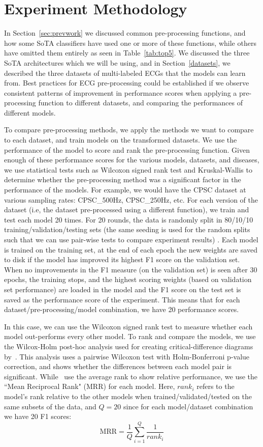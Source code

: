 \documentclass[pmlr,twocolumn]{jmlr}%
\begin{document}
\section{Experiment Methodology}
\label{sec:experiment}

In Section~\ref{sec:prevwork} we discussed common pre-processing functions, and how some SoTA classifiers have used one or more of these functions, while others have omitted them entirely as seen in Table~\ref{tab:top5}. We discussed the three SoTA architectures which we will be using, and in Section~\ref{datasets}, we described the three datasets of multi-labeled ECGs that the models can learn from. Best practices for ECG pre-processing could be established if we observe consistent patterns of improvement in performance scores when applying a pre-processing function to different datasets, and comparing the performances of different models.

To compare pre-processing methods, we apply the methods we want to compare to each dataset, and train models on the transformed datasets. We use the performance of the model to score and rank the pre-processing function. Given enough of these performance scores for the various models, datasets, and diseases, we use statistical tests such as Wilcoxon signed rank test and Kruskal-Wallis to determine whether the pre-processing method was a significant factor in the performance of the models. For example, we would have the CPSC dataset at various sampling rates: CPSC\_500Hz, CPSC\_250Hz, etc. For each version of the dataset (i.e, the dataset pre-processed using a different function), we train and test each model 20 times. For 20 rounds, the data is randomly split in 80/10/10 training/validation/testing sets (the same seeding is used for the random splits such that we can use pair-wise tests to compare experiment results) . Each model is trained on the training set, at the end of each epoch the new weights are saved to disk if the model has improved its highest F1 score on the validation set. When no improvements in the F1 measure (on the validation set) is seen after 30 epochs, the training stops, and the highest scoring weights (based on validation set performance) are loaded in the model and the F1 score on the test set is saved as the performance score of the experiment. This means that for each dataset/pre-processing/model combination, we have 20 performance scores. 

In this case, we can use the Wilcoxon signed rank test to measure whether each model out-performs every other model. To rank and compare the models, we use the Wilcox-Holm post-hoc analysis used for creating critical-difference diagrams by~\citet{IsmailFawaz2018deep}. This analysis uses a pairwise Wilcoxon test with Holm-Bonferroni p-value correction, and shows whether the differences between each model pair is significant. While~\citet{IsmailFawaz2018deep} use the average rank to show relative performance, we use the ``Mean Reciprocal Rank" (MRR) for each model. Here, $rank_i$ refers to the model's rank relative to the other models when trained/validated/tested on the same subsets of the data, and $Q=20$ since for each model/dataset combination we have 20 F1 scores:
\[ \text{MRR} = \frac{1}{Q}\sum_{i=1}^{Q}\frac{1}{rank_i} \]
\end{document}

